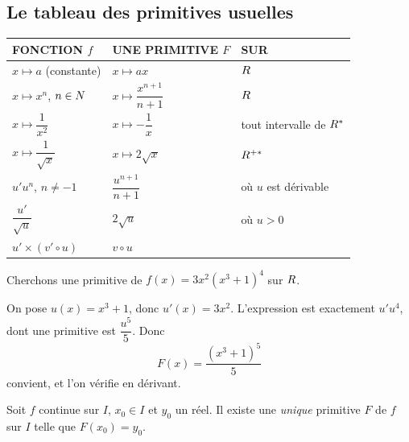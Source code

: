 \subsection{Le tableau des primitives usuelles}

\begin{center}
\renewcommand{\arraystretch}{1.6}
\begin{tabular}{@{}p{4.3cm} p{4.3cm} p{3.6cm}@{}}
\toprule
\textsf{\footnotesize\bfseries FONCTION $f$} &
\textsf{\footnotesize\bfseries UNE PRIMITIVE $F$} &
\textsf{\footnotesize\bfseries SUR} \\
\midrule
$x \mapsto a$ (constante)        & $x \mapsto ax$                       & $R$ \\
$x \mapsto x^{n}$, $n \in N$    & $x \mapsto \dfrac{x^{n+1}}{n+1}$     & $R$ \\
$x \mapsto \dfrac{1}{x^{2}}$     & $x \mapsto -\dfrac{1}{x}$            & tout intervalle de $R^{*}$ \\
$x \mapsto \dfrac{1}{\sqrt{x}}$  & $x \mapsto 2\sqrt{x}$                & $R^{+*}$ \\
\midrule
$u'u^{n}$, $n \neq -1$           & $\dfrac{u^{n+1}}{n+1}$               & où $u$ est dérivable \\
$\dfrac{u'}{\sqrt{u}}$           & $2\sqrt{u}$                          & où $u > 0$ \\
$u' \times (v'\circ u)$          & $v \circ u$                          & \\
\bottomrule
\end{tabular}
\end{center}


\begin{exemple}
Cherchons une primitive de $f(x) = 3x^{2}\left(x^{3}+1\right)^{4}$ sur $R$.

On pose $u(x) = x^{3}+1$, donc $u'(x) = 3x^{2}$. L'expression est exactement
$u'u^{4}$, dont une primitive est $\dfrac{u^{5}}{5}$. Donc
\[
  F(x) = \frac{\left(x^{3}+1\right)^{5}}{5}
\]
convient, et l'on vérifie en dérivant.
\end{exemple}

\begin{propriete}
Soit $f$ continue sur $I$, $x_{0} \in I$ et $y_{0}$ un réel. Il existe une
\emph{unique} primitive $F$ de $f$ sur $I$ telle que $F(x_{0}) = y_{0}$.
\end{propriete}

